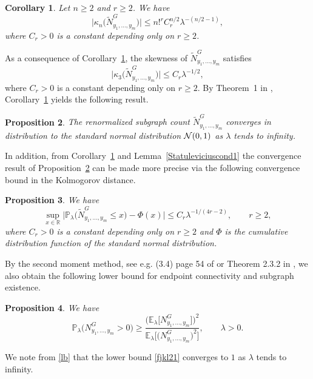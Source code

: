 \documentclass[12pt]{article}
\newcommand{\R}{\mathbb{R}}
\newcommand{\E}{\mathbb{E}}
\newcommand{\IP}{\mathbb{P}}
\newtheorem{prop}{Proposition}[section]
\newtheorem{corollary}[prop]{Corollary}
\numberwithin{equation}{section}
\begin{document}
 \begin{corollary}
  \label{jfklds}
  Let $n\geq 2$ and $r\geq 2$. 
 We have 
\begin{equation}
\nonumber %
\big|\kappa_n\big(\widetilde{N}_{y_1,\ldots , y_m}^G\big)\big|\leq n!^r 
C_r^{n/2}
\lambda^{-(n/2-1)},
\end{equation}
  where $C_r > 0$ is a constant depending only on $r \geq 2$.
\end{corollary}
 As a consequence of Corollary~\ref{jfklds}, 
 the skewness of $\widetilde{N}_{y_1,\ldots , y_m}^G$ satisfies  
$$
\big| \kappa_3 \big( \widetilde{N}_{y_1,\ldots , y_m}^G \big)\big|
\leq
C_r \lambda^{-1/2}, 
$$ 
where $C_r > 0$ is a constant depending only on $r \geq 2$.
By Theorem~1 in \cite{Janson1988},
 Corollary~\ref{jfklds} yields the following
 result. 
\begin{prop} 
\label{fjlfa12}
 The renormalized subgraph count $\widetilde{N}_{y_1,\ldots , y_m}^G$ 
 converges in distribution
 to the standard normal distribution
 ${\cal N}(0,1)$ as $\lambda$ tends to infinity.
\end{prop}
 In addition, from Corollary~\ref{jfklds} and
 Lemma~\ref{Statuleviciuscond1}
 the convergence result of Proposition~\ref{fjlfa12} can be
 made more precise via the following 
 convergence bound in the Kolmogorov distance.
 \begin{prop}
   \label{pkol}
   We have 
\begin{equation}
\nonumber
\sup_{x\in\R}\big|\IP_\lambda \big(\widetilde{N}_{y_1,\ldots , y_m}^G \leq x\big)-\Phi(x)\big|\leq C_r \lambda^{ - 1 / ( 4r-2 )},
\qquad  r\geq 2, 
\end{equation}
where $C_r>0$ is a constant depending only on $r\geq 2$
and $\Phi$ is the cumulative distribution function of the standard normal distribution. 
 \end{prop}
  By the second moment method, see e.g. (3.4) page 54 of
\cite{jansongraphs} or Theorem 2.3.2 in \cite{roch},
we also obtain the following lower bound
for endpoint connectivity and subgraph existence. %
\begin{prop}
  \label{jklf3}
  We have 
\begin{equation}
\label{fjkl21} 
\IP_\lambda \big( 
{N}_{y_1,\ldots , y_m}^G >0 \big) \geq
\frac{\big( \E_\lambda \big[ 
    N_{y_1,\ldots , y_m}^G 
    \big]\big)^2}{ 
  \E_\lambda \big[ \big( N_{y_1,\ldots , y_m}^G \big)^2\big]},
\qquad \lambda >0. 
\end{equation}
\end{prop}
We note from \eqref{lb} that the lower bound
\eqref{fjkl21} converges to $1$ as $\lambda$ tends to infinity. 
\end{document}
